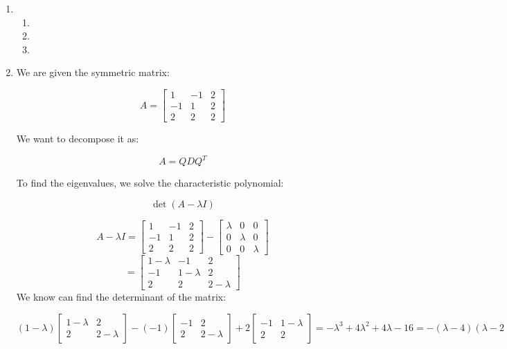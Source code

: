\documentclass[12pt]{article}
\begin{document}
\begin{enumerate}[leftmargin=0em]
    \item
    \begin{enumerate}[leftmargin=!]
        \item 
        \item 
        \item 
    \end{enumerate}

    \item We are given the symmetric matrix:

    \[
    A = \begin{bmatrix}
    1 & -1 & 2 \\
    -1 & 1 & 2 \\
    2 & 2 & 2
    \end{bmatrix}
    \]
    
    We want to decompose it as:
    
    \[
    A = Q D Q^T
    \]
    
    To find the eigenvalues, we solve the characteristic polynomial:
    
    \[\det(A - \lambda I) \]
    
    \[ A - \lambda I = \begin{bmatrix}
    1 & -1 & 2 \\
    -1 & 1 & 2 \\
    2 & 2 & 2
    \end{bmatrix}
    -
    \begin{bmatrix}
        \lambda & 0 & 0 \\
        0 & \lambda & 0 \\
        0 & 0 & \lambda
    \end{bmatrix}
    \]
    \[
    = \begin{bmatrix}
        1 - \lambda & -1 & 2 \\
        -1 & 1-\lambda & 2 \\
        2 & 2 & 2-\lambda
    \end{bmatrix}
    \]
    We know can find the determinant of the matrix:
    
    \[(1-\lambda)
    \begin{bmatrix}
    1-\lambda & 2 \\
    2 & 2-\lambda
    \end{bmatrix}
    -(-1)
    \begin{bmatrix}
        -1 & 2 \\
        2 & 2-\lambda
    \end{bmatrix}
    +2 \begin{bmatrix}
        -1 & 1-\lambda \\
        2 & 2
    \end{bmatrix} 
    = 
    -\lambda^{3} + 4\lambda^{2}+4\lambda-16 = -(\lambda - 4)(\lambda - 2)(\lambda + 2)
    \]
    

\end{enumerate}
\end{document}
